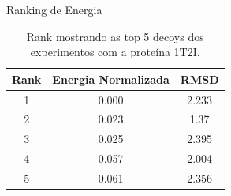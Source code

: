 \documentclass[10pt]{beamer}
\begin{document}
\begin{frame}{Ranking de Energia}
    \begin{table}[]
    \centering
    \caption{Rank mostrando as top 5 decoys dos experimentos com a proteína 1T2I.}
    \label{tab:protrank}
    \begin{tabular}{@{}ccc@{}}
        \toprule
        Rank & Energia Normalizada & RMSD  \\
        \midrule
        1    & 0.000             & 2.233 \\
        2    & 0.023             & 1.37  \\
        3    & 0.025             & 2.395 \\
        4    & 0.057             & 2.004 \\
        5    & 0.061             & 2.356 \\
        \bottomrule
    \end{tabular}
\end{table}
\end{frame}
\end{document}
